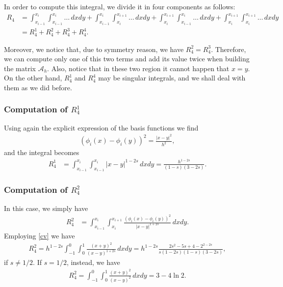 {In order to compute this integral, we divide it in four components as follows:
\begin{align*}
	R_4 &= \int_{x_{i-1}}^{x_i}\int_{x_{i-1}}^{x_i} \ldots\,dxdy + \int_{x_{i-1}}^{x_i}\int_{x_i}^{x_{i+1}} \ldots\,dxdy +
	\int_{x_i}^{x_{i+1}}\int_{x_{i-1}}^{x_i} \ldots\,dxdy +  \int_{x_i}^{x_{i+1}}\int_{x_i}^{x_{i+1}} \ldots\,dxdy
	\\
	&= R_4^1 + R_4^2 + R_4^3 + R_4^4.
\end{align*}

Moreover, we notice that, due to symmetry reason, we have $R_4^2 = R_4^3$. Therefore, we can compute only one of this two terms and add its value twice when building the matrix $\mathcal A_h$. Also, notice that in these two region it cannot happen that $x=y$. On the other hand, $R_4^1$ and $R_4^4$ may be singular integrals, and we shall deal with them as we did before. 

\subsubsection*{Computation of $R_4^1$}
Using again the explicit expression of the basis functions we find 
\begin{align*}
	(\phi_i(x)-\phi_i(y))^2 = \frac{|x-y|^2}{h^2},
\end{align*}
and the integral becomes
\begin{align*}
	R_4^1 &= \int_{x_{i-1}}^{x_i}\int_{x_{i-1}}^{x_i} |x-y|^{1-2s}\,dxdy = \frac{h^{1-2s}}{(1-s)(3-2s)}. 
\end{align*}

\subsubsection*{Computation of $R_4^2$}
In this case, we simply have
\begin{align*}
	R_4^2 &= \int_{x_{i-1}}^{x_i}\int_{x_i}^{x_{i+1}} \frac{(\phi_i(x)-\phi_i(y))^2}{|x-y|^{1+2s}}\,dxdy.
\end{align*}
Employing \eqref{cv} we have
\begin{align*}
	R_4^2 = h^{1-2s}\int_{-1}^0\int_0^1 \frac{(x+y)^2}{(x-y)^{1+2s}}\,dxdy = h^{1-2s}\frac{2s^2-5s+4-2^{2-2s}}{s(1-2s)(1-s)(3-2s)}, 
\end{align*}
if $s\neq 1/2$. If $s=1/2$, instead, we have
\begin{align*}
	R_4^2 = \int_{-1}^0\int_0^1 \frac{(x+y)^2}{(x-y)^2}\,dxdy = 3-4\ln 2.
\end{align*}
}

